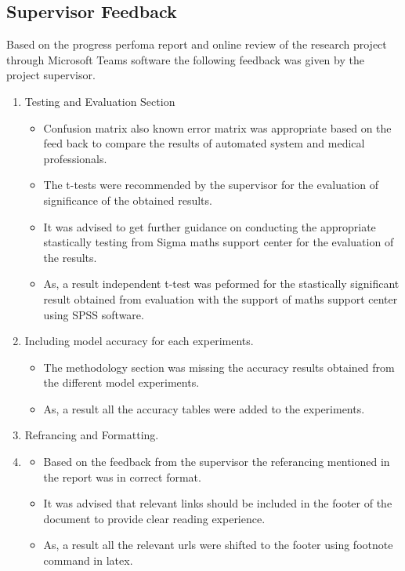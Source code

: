 
\subsection{Supervisor Feedback}
Based on the progress perfoma report and online review of the research project through Microsoft Teams software the 
following feedback was given by the project supervisor.
\begin{enumerate}
    \item Testing and Evaluation Section
    \begin{itemize}
        \item Confusion matrix also known error matrix was appropriate based on the feed back to compare the 
        results of automated system and medical professionals.
        \item The t-tests were recommended by the supervisor for the evaluation of significance of the 
        obtained results.
        \item It was advised to get further guidance on conducting the appropriate stastically testing from Sigma maths 
        support center for the evaluation of the results.
        \item As, a result independent t-test was peformed for the stastically significant result obtained 
        from evaluation with the support of maths support center using SPSS software.
    \end{itemize}

    \item Including model accuracy for each experiments.
    \begin{itemize}
        \item The methodology section was missing the accuracy results obtained from the different model experiments.
        \item As, a result all the accuracy tables were added to the experiments.
    \end{itemize}

    \item Refrancing and Formatting.
    \item \begin{itemize}
        \item Based on the feedback from the supervisor the referancing mentioned in the report was in correct format.
        \item It was advised that relevant links should be included in the footer of the document to 
        provide clear reading experience.
        \item As, a result all the relevant urls were shifted to the footer using footnote command in latex.
    \end{itemize}

\end{enumerate}
\pagebreak

